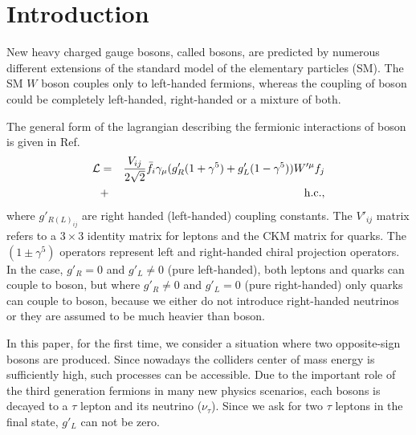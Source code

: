 \section{Introduction}\label{sec:int} 
New heavy charged gauge bosons, called \wprime bosons, are predicted by numerous different extensions of the standard model of the elementary particles (SM). 
The SM $W$ boson couples only to left-handed fermions, whereas the coupling of \wprime boson could be completely left-handed, right-handed or a mixture of both. 

The general form of the lagrangian describing the fermionic interactions of \wprime boson is given in  Ref.~\cite{Sullivan:2002jt}
\begin{eqnarray}
{\cal L}& =& \frac{V_{ij}}{2\sqrt{2}}\bar{f_i} \gamma_{\mu}(g^\prime_{R} (1+{\gamma}^5)+
g^\prime_{L}
(1-{\gamma}^5)) W^{\prime \mu} f_j  \nonumber\\
&+& \mathrm{h.c.},
\end{eqnarray}
where $g'_{R(L)_{ij}}$ are right handed (left-handed) coupling constants. The $V'_{ij}$ matrix refers to a $3\times3$ identity matrix for leptons and the CKM matrix for quarks. The $(1\pm{\gamma^5})$ operators represent left and right-handed chiral projection operators. In the case, $g'_R = 0$ and $g'_L \neq 0$ (pure left-handed), both leptons and quarks can couple to \wprime boson, but where $g'_R \neq 0$ and $g'_L = 0$ (pure right-handed) only quarks can couple to \wprime boson, because we either do not introduce right-handed neutrinos or they are assumed to be much heavier than \wprime boson. 

In this paper, for the first time, we consider a situation where two opposite-sign \wprime bosons are produced. Since nowadays the colliders center of mass energy is sufficiently high, such processes can be accessible. Due to the important role of the third generation fermions in many new physics scenarios, each \wprime bosons is decayed to a $\tau$ lepton and its neutrino ($\nu_{\tau}$). 
Since we ask for two $\tau$ leptons in the final state, $g'_L$ can not be zero. 

